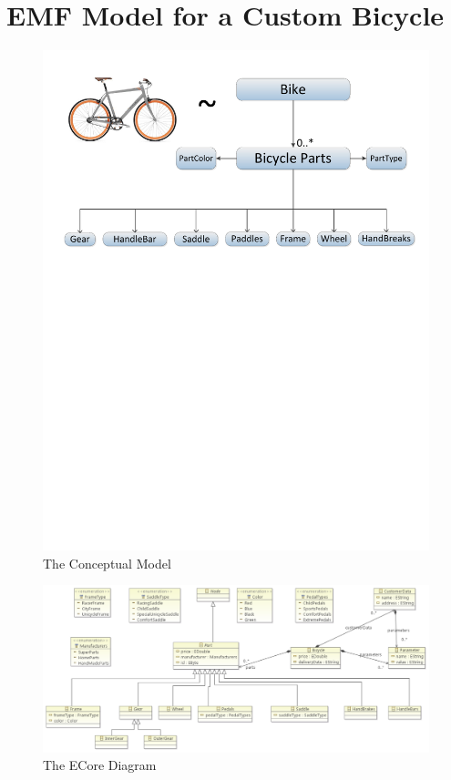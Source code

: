 \section{EMF Model for a Custom Bicycle}
\label{appendix.logical_model}

\begin{figure}[H]
    \begin{center}
        \includegraphics[width=\textwidth]{fig/real_conceptual_model.pdf}
        \caption{The Conceptual Model}
        \label{fig.conceptual_model}
    \end{center}
\end{figure}

\begin{figure}[H]
    \begin{center}
        \includegraphics[width=\textwidth]{fig/conceptual_model.pdf}
        \caption{The ECore Diagram}
        \label{fig.ecore_model}
    \end{center}
\end{figure}

